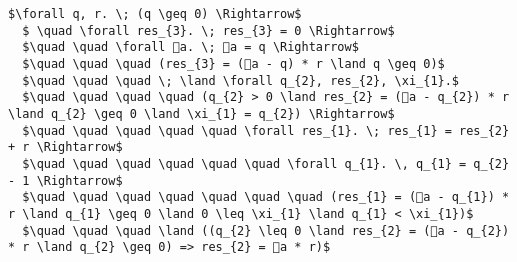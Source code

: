 \begin{lstlisting}[mathescape=true, escapechar=@]
  $\forall q, r. \; (q \geq 0) \Rightarrow$
  $ \quad \forall res_{3}. \; res_{3} = 0 \Rightarrow$
  $\quad \quad \forall 👻a. \; 👻a = q \Rightarrow$
  $\quad \quad \quad (res_{3} = (👻a - q) * r \land q \geq 0)$
  $\quad \quad \quad \; \land \forall q_{2}, res_{2}, \xi_{1}.$
  $\quad \quad \quad \quad (q_{2} > 0 \land res_{2} = (👻a - q_{2}) * r \land q_{2} \geq 0 \land \xi_{1} = q_{2}) \Rightarrow$
  $\quad \quad \quad \quad \quad \forall res_{1}. \; res_{1} = res_{2} + r \Rightarrow$
  $\quad \quad \quad \quad \quad \quad \forall q_{1}. \, q_{1} = q_{2} - 1 \Rightarrow$
  $\quad \quad \quad \quad \quad \quad \quad (res_{1} = (👻a - q_{1}) * r \land q_{1} \geq 0 \land 0 \leq \xi_{1} \land q_{1} < \xi_{1})$
  $\quad \quad \quad \land ((q_{2} \leq 0 \land res_{2} = (👻a - q_{2}) * r \land q_{2} \geq 0) => res_{2} = 👻a * r)$
  \end{lstlisting}
